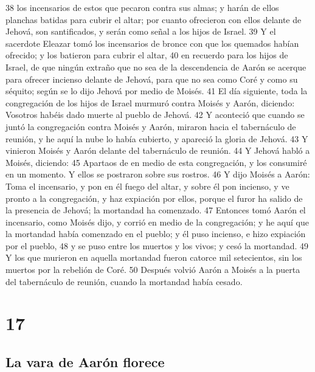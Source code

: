 38 los incensarios de estos que pecaron contra sus almas; y harán de ellos planchas batidas para cubrir el altar; por cuanto ofrecieron con ellos delante de Jehová, son santificados, y serán como señal a los hijos de Israel.
39 Y el sacerdote Eleazar tomó los incensarios de bronce con que los quemados habían ofrecido; y los batieron para cubrir el altar,
40 en recuerdo para los hijos de Israel, de que ningún extraño que no sea de la descendencia de Aarón se acerque para ofrecer incienso delante de Jehová, para que no sea como Coré y como su séquito; según se lo dijo Jehová por medio de Moisés.
41 El día siguiente, toda la congregación de los hijos de Israel murmuró contra Moisés y Aarón, diciendo: Vosotros habéis dado muerte al pueblo de Jehová.
42 Y aconteció que cuando se juntó la congregación contra Moisés y Aarón, miraron hacia el tabernáculo de reunión, y he aquí la nube lo había cubierto, y apareció la gloria de Jehová.
43 Y vinieron Moisés y Aarón delante del tabernáculo de reunión.
44 Y Jehová habló a Moisés, diciendo:
45 Apartaos de en medio de esta congregación, y los consumiré en un momento. Y ellos se postraron sobre sus rostros.
46 Y dijo Moisés a Aarón: Toma el incensario, y pon en él fuego del altar, y sobre él pon incienso, y ve pronto a la congregación, y haz expiación por ellos, porque el furor ha salido de la presencia de Jehová; la mortandad ha comenzado.
47 Entonces tomó Aarón el incensario, como Moisés dijo, y corrió en medio de la congregación; y he aquí que la mortandad había comenzado en el pueblo; y él puso incienso, e hizo expiación por el pueblo,
48 y se puso entre los muertos y los vivos; y cesó la mortandad.
49 Y los que murieron en aquella mortandad fueron catorce mil setecientos, sin los muertos por la rebelión de Coré.
50 Después volvió Aarón a Moisés a la puerta del tabernáculo de reunión, cuando la mortandad había cesado.

\chapter{17}

\section*{La vara de Aarón florece}


